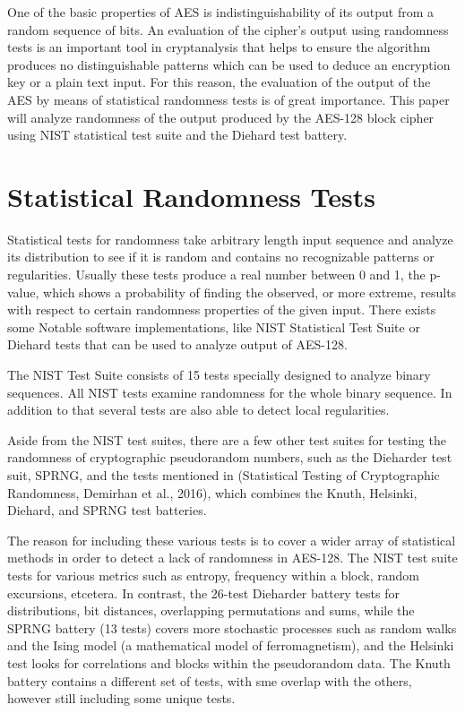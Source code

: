\documentclass[conference]{IEEEtran}
\begin{document}
One of the basic properties of AES is indistinguishability of its output from a random sequence of bits. An evaluation of the cipher's output using randomness tests is an important tool in cryptanalysis that helps to ensure the algorithm produces no distinguishable patterns which can be used to deduce an encryption key or a plain text input. For this reason, the evaluation of the output of the AES by means of statistical randomness tests is of great importance. This paper will analyze randomness
of the output produced by the AES-128 block cipher using NIST statistical test suite and  the Diehard test battery.
\section{Statistical Randomness Tests}

Statistical tests for randomness take arbitrary length input sequence and analyze its distribution to see if it is random and contains no recognizable patterns or regularities. Usually these tests produce a real number between 0 and 1, the p-value, which shows a probability of finding the observed, or more extreme, results with respect to certain randomness properties of the given input. There exists some Notable software implementations, like NIST Statistical Test Suite or Diehard tests that can be used to analyze output of AES-128. 

The NIST Test Suite consists of 15 tests specially designed to analyze
binary sequences. All NIST tests examine randomness for the whole binary sequence. In addition to that several tests are also able to detect local regularities. 

Aside from the NIST test suites, there are a few other test suites for testing the randomness of cryptographic pseudorandom numbers, such as the Dieharder test suit, SPRNG, and the tests mentioned in  (Statistical Testing of Cryptographic Randomness, Demirhan et al., 2016), which combines the Knuth, Helsinki, Diehard, and SPRNG test batteries.

The reason for including these various tests is to cover a wider array of statistical methods in order to detect a lack of randomness in AES-128. The NIST test suite tests for various metrics such as entropy, frequency within a block, random excursions, etcetera. In contrast, the 26-test Dieharder battery tests for distributions, bit distances, overlapping permutations and sums, while the SPRNG battery (13 tests) covers more stochastic processes such as random walks and the Ising model (a
mathematical model of ferromagnetism), and the Helsinki test looks for correlations and blocks within the pseudorandom data. The Knuth battery contains a different set of tests, with sme overlap with the others, however still including some unique tests. 
\end{document}

